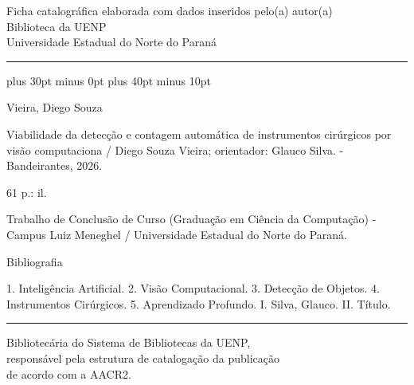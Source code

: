 \begingroup\centering\singlespacing\small
{}
Ficha catalográfica elaborada com dados inseridos pelo(a) autor(a)\\
Biblioteca da UENP\\
Universidade Estadual do Norte do Paraná\par
\vspace{2\baselineskip}\hrule\vspace{.8\baselineskip}
\RaggedRightRightskip 0pt plus 30pt minus 0pt\relax
\RaggedRightParfillskip 20pt plus 40pt minus 10pt\relax
\ttfamily\hspace{2em}\begin{minipage}[t]{125mm}
\RaggedRight\sloppy\settowidth{\parindent}{123}

\noindent Vieira, Diego Souza

Viabilidade da detecção e contagem automática de instrumentos cirúrgicos por visão computaciona / Diego Souza Vieira; orientador: Glauco Silva. - Bandeirantes, 2026.

61 p.: il.

\vspace{1\baselineskip}


\vspace{1\baselineskip}


Trabalho de Conclusão de Curso (Graduação em Ciência da Computação) - Campus Luiz Meneghel / Universidade Estadual do Norte do Paraná.

Bibliografia



\vspace{1\baselineskip}


\vspace{1\baselineskip}


1. Inteligência Artificial. 2. Visão Computacional. 3. Detecção de Objetos. 4. Instrumentos Cirúrgicos. 5. Aprendizado Profundo. I. Silva, Glauco. II. Título.

\end{minipage}\par
\vspace{1\baselineskip}\hrule\vspace{.5\baselineskip}\rmfamily
Bibliotecária do Sistema de Bibliotecas da UENP,\\
responsável pela estrutura de catalogação da publicação\\
de acordo com a AACR2.
\par\endgroup